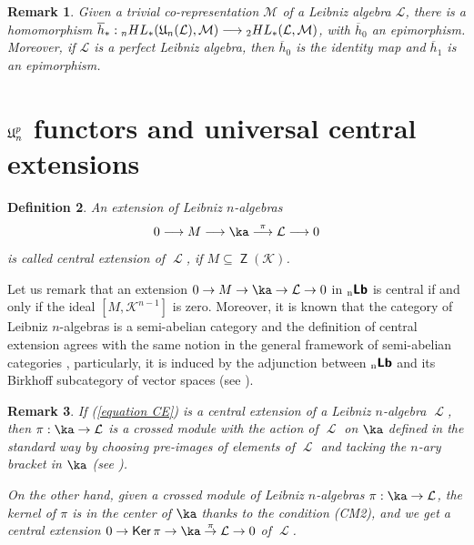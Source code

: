 \documentclass[12pt, reqno]{amsart}
\newtheorem{definition}{Definition}[section]
\newtheorem{remark}[definition]{Remark}
\newcommand{\lra}{\longrightarrow}
\def\nLb{\operatorname{{}_{n}\textbf{\textsf{Lb}}}}
\def\U{\operatorname{\frak{U}}}
\def\ele{\operatorname{\mathcal{L}}}
\DeclareMathOperator{\Ker}{\mathsf {Ker}}
\DeclareMathOperator{\Z}{\mathsf {Z}}
\begin{document}
\begin{remark}
Given a trivial co-representation $\mathcal{M}$ of a Leibniz algebra $\mathcal{L}$,
there is a homomorphism $\overline{h}_*: {}_{n}HL_*(\U_n(\mathcal{L}), \mathcal{M}) \lra {}_2HL_*(\mathcal{L}, \mathcal{M})$, with $\overline{h}_0$ an epimorphism. Moreover, if $\mathcal{L}$ is a perfect Leibniz algebra, then $\overline{h}_0$ is the identity map and $\overline{h}_1$ is an epimorphism.
\end{remark}




\section{$\U_n^p$ functors and universal central extensions}\label{Section UCE}

\begin{definition} \cite{Ca}
An extension of Leibniz $n$-algebras
\begin{equation}\label{equation CE}
0 \lra M \lra {\ka} \stackrel{\pi} \lra {\ele} \lra 0
\end{equation}
is called central extension of $\ele$, if $M\subseteq \Z(\mathcal{K})$.
 \end{definition}

Let us remark that an extension $0 \to M \to {\ka} \to {\ele} \to 0$ in $\nLb$ is central if and
only if the ideal $[M, {\mathcal{K}}^{n-1}]$ is zero.
Moreover, it is known that the category of Leibniz $n$-algebras is a semi-abelian category and
the definition of central extension agrees with the same notion in the general framework of semi-abelian categories
 \cite{JaKe}, particularly, it is induced by the adjunction between $\nLb$ and its Birkhoff subcategory of vector spaces (see \cite{CKLT}).



\begin{remark}

If (\ref{equation CE}) is a central extension of a Leibniz $n$-algebra $\ele$, then $\pi: {\ka} \to {\ele}$ is a crossed module with the action of $\ele$ on $\ka$ defined in the standard way by choosing pre-images of elements of $\ele$ and tacking the $n$-ary bracket in $\ka$ (see \cite[Example 2 (iii)]{CKL1}).

On the other hand,  given a crossed module of Leibniz $n$-algebras $\pi: {\ka} \to {\ele}$, the kernel of $\pi$ is in the center of $\ka$ thanks to the condition (CM2), and we get a central extension $0 \to \Ker\pi \to {\ka} \stackrel{\pi} \to {\ele} \to 0$  of $\ele$.
\end{remark}
\end{document}
